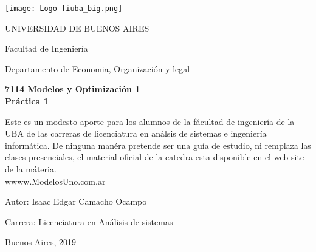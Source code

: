 \documentclass[12pt]{book}
\begin{document}
\thispagestyle{empty}

\begin {center}

\texttt{[image: Logo-fiuba\_big.png]}

\medskip
UNIVERSIDAD DE BUENOS AIRES

Facultad de Ingenier\'ia

Departamento de Economia, Organizaci\'on y legal


\vspace{3cm}


\textbf{\large 7114 Modelos y Optimizaci\'on 1}
\\
\textbf{\large Pr\'actica 1}
\vspace{2cm}


Este es un modesto aporte para los alumnos de la f\'acultad de ingenier\'ia  de la UBA de las carreras de licenciatura en an\'alsis de sistemas e ingenier\'ia inform\'atica.
De ninguna man\'era pretende ser una gu\'ia de estudio, ni remplaza las clases presenciales, el material oficial de la catedra esta disponible en el web site de la m\'ateria.
\\
wwww.ModelosUno.com.ar

\end {center}


\vspace{2.5cm}

\noindent Autor:	Isaac Edgar Camacho Ocampo
 
\noindent Carrera:	Licenciatura en An\'alisis de sistemas

\vspace{1cm}

\vspace{1cm}

\noindent Buenos Aires, 2019

\newpage
\end{document}
